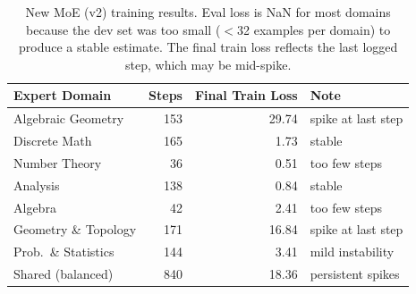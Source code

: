 \documentclass[11pt,a4paper]{article}
\begin{document}
\begin{table}[t]
\centering
\caption{New MoE (v2) training results. Eval loss is NaN for most domains because the dev set was too small ($<$32 examples per domain) to produce a stable estimate. The final train loss reflects the last logged step, which may be mid-spike.}
\label{tab:loss_curves_v2}
\small
\begin{tabular}{@{}lrrl@{}}
\toprule
\textbf{Expert Domain} & \textbf{Steps} & \textbf{Final Train Loss} & \textbf{Note} \\
\midrule
Algebraic Geometry & 153 & 29.74 & spike at last step \\
Discrete Math      & 165 & 1.73  & stable \\
Number Theory      & 36  & 0.51  & too few steps \\
Analysis           & 138 & 0.84  & stable \\
Algebra            & 42  & 2.41  & too few steps \\
Geometry \& Topology & 171 & 16.84 & spike at last step \\
Prob.\ \& Statistics & 144 & 3.41  & mild instability \\
Shared (balanced)  & 840 & 18.36 & persistent spikes \\
\bottomrule
\end{tabular}
\end{table}
\end{document}
